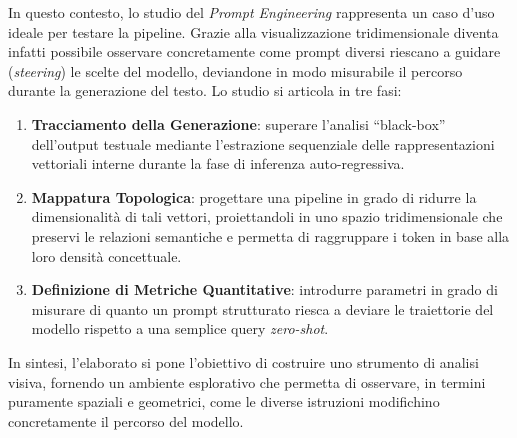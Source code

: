 In questo contesto, lo studio del \textit{Prompt Engineering} rappresenta un caso d'uso ideale per testare la pipeline. Grazie alla visualizzazione tridimensionale diventa infatti possibile osservare concretamente come prompt diversi riescano a guidare (\textit{steering}) le scelte del modello, deviandone in modo misurabile il percorso durante la generazione del testo. Lo studio si articola in tre fasi:
\begin{enumerate}
    \item \textbf{Tracciamento della Generazione}: superare l'analisi ``black-box'' dell'output testuale mediante l'estrazione sequenziale delle rappresentazioni vettoriali interne durante la fase di inferenza auto-regressiva.
    \item \textbf{Mappatura Topologica}: progettare una pipeline in grado di ridurre la dimensionalità di tali vettori, proiettandoli in uno spazio tridimensionale che preservi le relazioni semantiche e permetta di raggruppare i token in base alla loro densità concettuale.
    \item \textbf{Definizione di Metriche Quantitative}: introdurre parametri in grado di misurare di quanto un prompt strutturato riesca a deviare le traiettorie del modello rispetto a una semplice query \textit{zero-shot}.
\end{enumerate}

In sintesi, l'elaborato si pone l'obiettivo di costruire uno strumento di analisi visiva, fornendo un ambiente esplorativo che permetta di osservare, in termini puramente spaziali e geometrici, come le diverse istruzioni modifichino concretamente il percorso del modello.